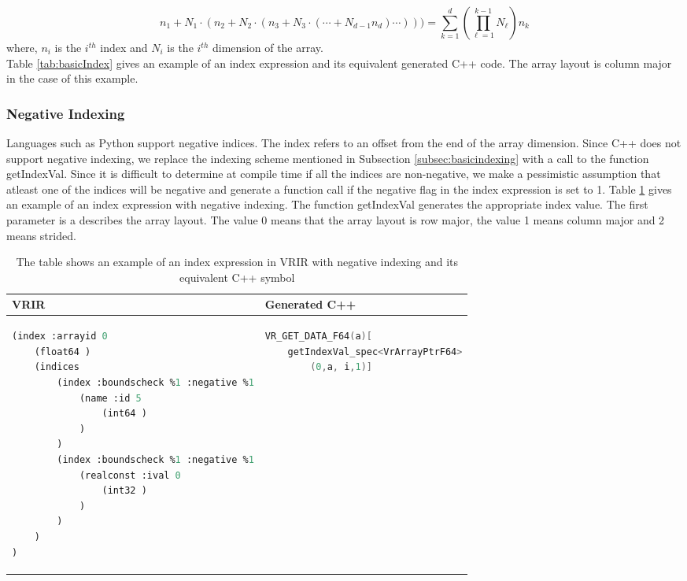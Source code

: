 \begin{equation}
n_1 + N_1 \cdot (n_2 + N_2 \cdot (n_3 + N_3 \cdot (\cdots + N_{d-1} n_d)\cdots)))
= \sum_{k=1}^d \left( \prod_{\ell=1}^{k-1} N_\ell \right) n_k
\end{equation} 
 where, $n_i$ is the $ i^{th}$ index and  $N_i$ is the $i^{th}$ dimension of the array. \\
Table \ref{tab:basicIndex} gives an example of an index expression and its equivalent generated C++ code. The array layout is column major in the case of this example.
\subsubsection{Negative Indexing}
Languages such as Python support negative indices. The index refers to an offset from the end of the array dimension. Since C++ does not support negative indexing, we replace the indexing scheme mentioned in Subsection \ref{subsec:basicindexing} with a call to the function \textsf{getIndexVal}. Since it is difficult to determine at compile time if all the indices are non-negative, we make a pessimistic assumption that atleast one of the indices will be negative and generate a function call if the negative flag in the index expression is set to 1. Table \ref{tab:negIndex} gives an example of an index expression with negative indexing. The function \textsf{getIndexVal} generates the appropriate index value. The first parameter is a describes the array layout. The value 0 means that the array layout is row major, the value 1 means column major and 2 means strided. 
\begin{table}[htbp]
\centering
\begin{tabular}{|l|l|}
\hline

VRIR &  Generated C++ \\
\hline
{
\begin{lstlisting}[language=lisp,frame=none, numbers=none]
(index :arrayid 0
	(float64 )
	(indices
		(index :boundscheck %1 :negative %1
			(name :id 5
				(int64 )
			)
		)
		(index :boundscheck %1 :negative %1
			(realconst :ival 0
				(int32 )
			)
		)
	)
)
\end{lstlisting}
}
&
{
\begin{lstlisting}[language=c,frame=none, numbers=none]
 VR_GET_DATA_F64(a)[
	getIndexVal_spec<VrArrayPtrF64>
		(0,a, i,1)]
\end{lstlisting}
} \\
\hline
\end{tabular}
\caption[Negative Indexing example]{The table shows an example of an index expression in VRIR  with negative indexing and its equivalent C++ symbol}
\label{tab:negIndex}
\end{table}
